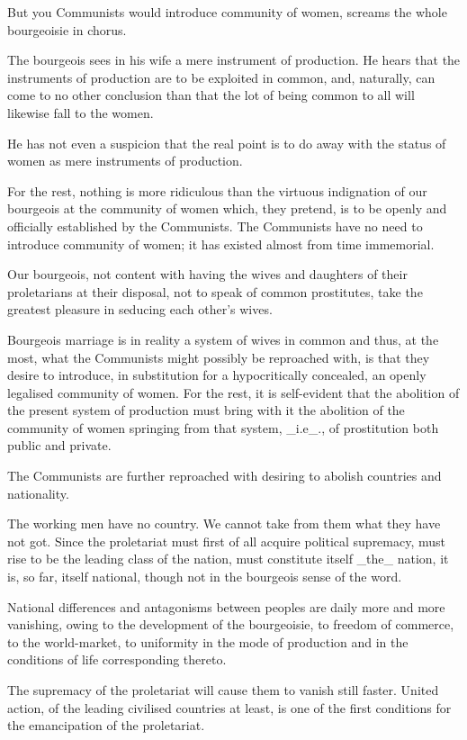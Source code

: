 But you Communists would introduce community of women, screams the
whole bourgeoisie in chorus.

The bourgeois sees in his wife a mere instrument of production. He
hears that the instruments of production are to be exploited in common,
and, naturally, can come to no other conclusion than that the lot of
being common to all will likewise fall to the women.

He has not even a suspicion that the real point is to do away with the
status of women as mere instruments of production.

For the rest, nothing is more ridiculous than the virtuous indignation
of our bourgeois at the community of women which, they pretend, is to
be openly and officially established by the Communists. The Communists
have no need to introduce community of women; it has existed almost
from time immemorial.

Our bourgeois, not content with having the wives and daughters of their
proletarians at their disposal, not to speak of common prostitutes,
take the greatest pleasure in seducing each other’s wives.

Bourgeois marriage is in reality a system of wives in common and thus,
at the most, what the Communists might possibly be reproached with, is
that they desire to introduce, in substitution for a hypocritically
concealed, an openly legalised community of women. For the rest, it is
self-evident that the abolition of the present system of production
must bring with it the abolition of the community of women springing
from that system, _i.e_., of prostitution both public and private.

The Communists are further reproached with desiring to abolish
countries and nationality.

The working men have no country. We cannot take from them what they
have not got. Since the proletariat must first of all acquire political
supremacy, must rise to be the leading class of the nation, must
constitute itself _the_ nation, it is, so far, itself national, though
not in the bourgeois sense of the word.

National differences and antagonisms between peoples are daily more and
more vanishing, owing to the development of the bourgeoisie, to freedom
of commerce, to the world-market, to uniformity in the mode of
production and in the conditions of life corresponding thereto.

The supremacy of the proletariat will cause them to vanish still
faster. United action, of the leading civilised countries at least, is
one of the first conditions for the emancipation of the proletariat.

